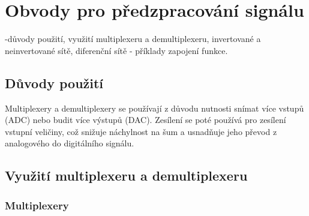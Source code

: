 \section{Obvody pro předzpracování signálu}
-důvody použití, využití multiplexeru a demultiplexeru, invertované a neinvertované sítě, diferenční sítě - příklady zapojení funkce.

\subsection{Důvody použití}
Multiplexery a demultiplexery se používají z důvodu nutnosti snímat více vstupů (ADC) nebo budit více výstupů (DAC). Zesílení se poté používá pro zesílení vstupní veličiny, což snižuje náchylnost na šum a usnadňuje jeho převod z analogového do digitálního signálu.

\subsection{Využití multiplexeru a demultiplexeru}
\subsubsection{Multiplexery}